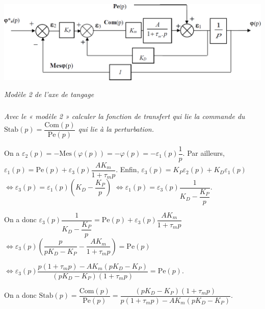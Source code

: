 \documentclass[10pt,fleqn]{article} %
\begin{document}
\begin{multicols}{2}
\begin{center}
\includegraphics[width=\linewidth]{images/fig_03}

\textit{Modèle 2 de l’axe de tangage}
\end{center}


\subparagraph{}
\textit{Avec le « modèle 2 » calculer la fonction de transfert qui lie la commande du $\text{Stab}(p)=\dfrac{\text{Com}(p)}{\text{Pe}(p)}$
qui lie à la perturbation.}%
\ifprof
\begin{corrige}
On a $\varepsilon_2(p) = -\text{Mes}\left( \varphi(p)\right) = -\varphi(p) = -\varepsilon_1(p)\dfrac{1}{p}$. 
Par ailleurs, $\varepsilon_1(p)=\text{Pe}(p)+\varepsilon_3(p)\dfrac{AK_m}{1+\tau_m p}$. 
Enfin, $\varepsilon_3(p)=K_P\varepsilon_2(p)+K_D \varepsilon_1(p)$ $\Leftrightarrow \varepsilon_3(p)=\varepsilon_1(p)\left(K_D-\dfrac{K_P}{p} \right)$
$\Leftrightarrow \varepsilon_1(p) =\varepsilon_3(p)\dfrac{1}{K_D -\dfrac{K_P}{p} }$. 

On a donc  $\varepsilon_3(p)\dfrac{1}{K_D -\dfrac{K_P}{p}}=\text{Pe}(p)+\varepsilon_3(p)\dfrac{AK_m}{1+\tau_m p} $ $\Leftrightarrow \varepsilon_3(p)\left(\dfrac{p}{pK_D-K_P } -\dfrac{AK_m}{1+\tau_m p}\right)=\text{Pe}(p) $ 

$\Leftrightarrow \varepsilon_3(p)\dfrac{p\left(1+\tau_m p \right) - AK_m \left( pK_D-K_P\right) }{\left(pK_D-K_P \right) \left(1+\tau_m p\right)}=\text{Pe}(p) $.

On a donc $\text{Stab}(p)=\dfrac{\text{Com}(p)}{\text{Pe}(p)}=\dfrac{\left(pK_D-K_P \right) \left(1+\tau_m p\right)}{p\left(1+\tau_m p \right) - AK_m \left( pK_D-K_P\right) }$.



 
\end{corrige}
\else
\fi


\end{multicols}
\end{document}

